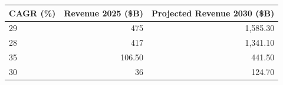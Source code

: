 

\begin{tabular}{@{}lrr@{}}
\toprule
CAGR (\%) & Revenue 2025 (\$B) & Projected Revenue 2030 (\$B) \\
\midrule
29 & 475 & 1,585.30 \\
28 & 417 & 1,341.10 \\
35 & 106.50 & 441.50 \\
30 & 36 & 124.70 \\
\bottomrule
\end{tabular}